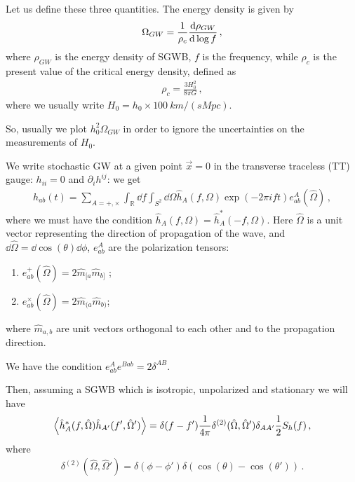 \documentclass[main.tex]{subfiles}
\begin{document}
Let us define these three quantities. The energy density is given by 
%
\begin{align}
\Omega_{GW} = \frac{1}{\rho_{c}} \dv{\rho_{GW} }{\log f}
\,,
\end{align}
%
where \(\rho_{GW}\) is the energy density of SGWB, \(f\) is the frequency, while \(\rho_{c}\) is the present value of the critical energy density, defined as 
%
\begin{align}
\rho_{c} = \frac{3 H_0^2}{8 \pi G }
\,,
\end{align}
%
where we usually write \(H_0 = h_0 \times \SI{100}{km / (s Mpc)}\). 

So, usually we plot \(h_0^2 \Omega_{GW}\) in order to ignore the uncertainties on the measurements of \(H_0 \). 

We write stochastic GW at a given point \(\vec{x} = 0 \) in the transverse traceless (TT) gauge: \(h_{ii} = 0\) and \(\partial_{i} h^{ij}\): we get 
%
\begin{align}
h_{ab}(t) = \sum _{A = +, \times } \int_{\mathbb{R}} \dd{f} \int_{S^{2}} \dd{\Omega } \hat{h}_A (f, \Omega ) \exp( - 2 \pi i f t ) e^{A}_{ab} (\hat{\Omega})
\,,
\end{align}
%
where we must have the condition \(\hat{h}_A (f, \Omega ) = \hat{h}^{*}_{A} (-f, \Omega )\). Here \(\hat{\Omega}\) is a unit vector representing the direction of propagation of the wave, and \(\dd{\hat{\Omega}} = \dd{\cos(\theta )} \dd{\phi }\), \(e^{A}_{ab}\) are the polarization tensors: 
\begin{enumerate}
  \item \(e^{+}_{ab} (\hat{\Omega}) = 2\hat{m}_{[a} \hat{m}_{b]}\) ;
  \item \(e^{ \times }_{ab} (\hat{\Omega}) = 2\hat{m}_{(a} \hat{m}_{b)}\);
\end{enumerate}
where \(\hat{m}_{a, b}\) are unit vectors orthogonal to each other and to the propagation direction.

We have the condition \(e^{A}_{ab} e^{B ab} = 2 \delta^{AB}\). 

Then, assuming a SGWB which is isotropic, unpolarized and stationary we will have 
%
\begin{align}
\expval{\hat{h}^{*}_{A} (f, \hat{\Omega}) \hat{h}_{A'} (f',  \hat{\Omega }' )} = \delta (f- f') \frac{1}{4 \pi } \delta^{(2)}( \hat{\Omega}, \hat{\Omega }' ) \delta_{A A'} \frac{1}{2} S_{h}(f)
\,,
\end{align}
%
where 
%
\begin{align}
\delta^{(2)} (\hat{\Omega}, \hat{\Omega}')= \delta(\phi - \phi') \delta(\cos(\theta ) - \cos(\theta' ))
\,.
\end{align}
\end{document}
